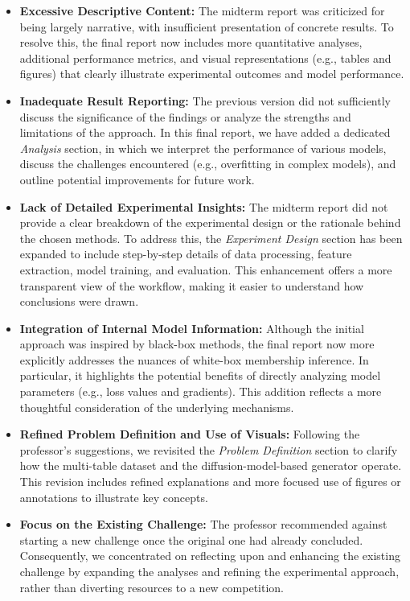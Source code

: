 \documentclass[12pt]{article}
\begin{document}
\begin{itemize}
    \item \textbf{Excessive Descriptive Content:}
    The midterm report was criticized for being largely narrative, with insufficient presentation of concrete results. To resolve this, the final report now includes more quantitative analyses, additional performance metrics, and visual representations (e.g., tables and figures) that clearly illustrate experimental outcomes and model performance.

    \item \textbf{Inadequate Result Reporting:}
    The previous version did not sufficiently discuss the significance of the findings or analyze the strengths and limitations of the approach. In this final report, we have added a dedicated \textit{Analysis} section, in which we interpret the performance of various models, discuss the challenges encountered (e.g., overfitting in complex models), and outline potential improvements for future work.

    \item \textbf{Lack of Detailed Experimental Insights:}
    The midterm report did not provide a clear breakdown of the experimental design or the rationale behind the chosen methods. To address this, the \textit{Experiment Design} section has been expanded to include step-by-step details of data processing, feature extraction, model training, and evaluation. This enhancement offers a more transparent view of the workflow, making it easier to understand how conclusions were drawn.

    \item \textbf{Integration of Internal Model Information:}
    Although the initial approach was inspired by black-box methods, the final report now more explicitly addresses the nuances of white-box membership inference. In particular, it highlights the potential benefits of directly analyzing model parameters (e.g., loss values and gradients). This addition reflects a more thoughtful consideration of the underlying mechanisms.

    \item \textbf{Refined Problem Definition and Use of Visuals:}
    Following the professor’s suggestions, we revisited the \textit{Problem Definition} section to clarify how the multi-table dataset and the diffusion-model-based generator operate. This revision includes refined explanations and more focused use of figures or annotations to illustrate key concepts.

    \item \textbf{Focus on the Existing Challenge:}
    The professor recommended against starting a new challenge once the original one had already concluded. Consequently, we concentrated on reflecting upon and enhancing the existing challenge by expanding the analyses and refining the experimental approach, rather than diverting resources to a new competition.
\end{itemize}
\end{document}
